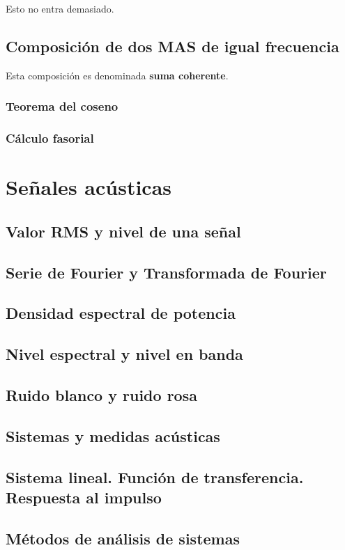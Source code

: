 \documentclass[a4paper]{book}
\begin{document}
Esto no entra demasiado.

\section{Composición de dos MAS de igual frecuencia}

Esta composición es denominada \textbf{suma coherente}.

\subsection{Teorema del coseno}

\subsection{Cálculo fasorial}

\chapter{Señales acústicas}
\section{Valor RMS y nivel de una señal}
\section{Serie de Fourier y Transformada de Fourier}
\section{Densidad espectral de potencia}
\section{Nivel espectral y nivel en banda}
\section{Ruido blanco y ruido rosa}
\section{Sistemas y medidas acústicas}
\section{Sistema lineal. Función de transferencia. Respuesta al impulso}
\section{Métodos de análisis de sistemas}
\end{document}
